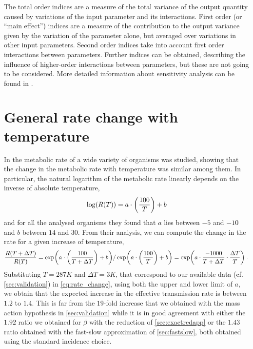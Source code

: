 The total order indices are a measure of the total variance of the output
quantity caused by variations of the input parameter and its interactions.
First order (or ``main effect'') indices are a measure of the contribution to
the output variance given by the variation of the parameter alone, but averaged
over variations in other input parameters. Second order indices take into
account first order interactions between parameters. Further indices can be
obtained, describing the influence of higher-order interactions between
parameters, but these are not going to be considered.
More detailed information about sensitivity analysis can be found in
\cite{Sensitivity_analysis_book}.

\section{General rate change with temperature} \label{app:rate_change}

In \cite{Gillooly2248} the metabolic rate of a wide variety of organisms
was studied, showing that the change in the metabolic rate with temperature was
similar among them. In particular, the natural logarithm of the metabolic rate
linearly depends on the inverse of absolute temperature,
\begin{equation}
    \log(R(T))=a\cdot\left(\frac{100}{T}\right)+b
\end{equation}
and for all the analysed organisms they found that $a$ lies between $-5$
and $-10$ and $b$ between $14$ and $30$. From their analysis, we can compute
the change in the rate for a given increase of temperature,
\begin{equation}\label{eq:rate_change}
    \frac{R(T+\Delta T)}{R(T)}=\exp(a\cdot\left(\frac{100}{T + \Delta
            T}\right)+b) / \exp(a\cdot\left(\frac{100}{T}\right)+b) = \exp(a \cdot
    \frac{-1000}{T+\Delta T}\cdot \frac{\Delta T}{T}) \ .
\end{equation}
Substituting $T=287 K$ and $\Delta T=3 K$, that correspond to our available
data (cf. \cref{sec:validation}) in \cref{eq:rate_change}, using both the upper
and lower limit of $a$, we obtain that the expected increase in the effective
transmission rate is between $1.2$ to $1.4$. This is far from the $19$-fold
increase that we obtained with the mass action hypothesis in
\cref{sec:validation}
while it is in good agreement with either the $1.92$ ratio we obtained	for
$\bar{\beta}$ with the reduction of \cref{sec:exactredapp} or the $1.43$ ratio
obtained with the fast-slow approximation of \cref{sec:fastslow}, both obtained
using the standard incidence choice.

